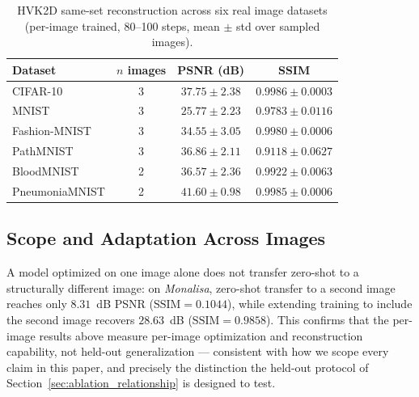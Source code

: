 \documentclass[sn-mathphys,Numbered]{sn-jnl}
\begin{document}
\begin{table}[t]
\centering
\caption{HVK2D same-set reconstruction across six real image datasets (per-image trained, 80--100 steps, mean $\pm$ std over sampled images).}
\label{tab:sameset_multi_dataset}
\scriptsize
\begin{tabular}{lccc}
\toprule
Dataset & $n$ images & PSNR (dB) & SSIM \\
\midrule
CIFAR-10 & 3 & $37.75\pm2.38$ & $0.9986\pm0.0003$ \\
MNIST & 3 & $25.77\pm2.23$ & $0.9783\pm0.0116$ \\
Fashion-MNIST & 3 & $34.55\pm3.05$ & $0.9980\pm0.0006$ \\
PathMNIST & 3 & $36.86\pm2.11$ & $0.9118\pm0.0627$ \\
BloodMNIST & 2 & $36.57\pm2.36$ & $0.9922\pm0.0063$ \\
PneumoniaMNIST & 2 & $41.60\pm0.98$ & $0.9985\pm0.0006$ \\
\bottomrule
\end{tabular}
\end{table}

\subsection{Scope and Adaptation Across Images}
\label{sec:no_generalization}
A model optimized on one image alone does not transfer zero-shot to a structurally different image: on \textit{Monalisa}, zero-shot transfer to a second image reaches only $8.31$~dB PSNR ($\mathrm{SSIM}=0.1044$), while extending training to include the second image recovers $28.63$~dB ($\mathrm{SSIM}=0.9858$). This confirms that the per-image results above measure per-image optimization and reconstruction capability, not held-out generalization --- consistent with how we scope every claim in this paper, and precisely the distinction the held-out protocol of Section~\ref{sec:ablation_relationship} is designed to test.
\end{document}
